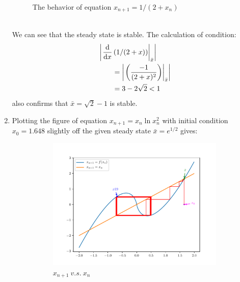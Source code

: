 \begin{homeworkProblem}[2]
\begin{enumerate}
\begin{figure}[h]
    \centering
    \caption{The behavior of equation $x_{n+1} = 1/(2+x_n)$}
\end{figure}
\\
We can see that the steady state is stable. The calculation of condition:
\[
    \begin{aligned}
        &\left|\left.\frac{\mathrm{d}}{\mathrm{d}x} \left(1/(2+x)\right)\right|_{\bar x}\right|\\
        &\qquad = \left| \left.\left(\frac{-1}{(2+x)^2}\right)\right|_{\bar x}
        \right|\\
        &\qquad = 3 - 2\sqrt{2} < 1
    \end{aligned}
\]
also confirms that $\bar x = \sqrt{2} - 1$ is stable.

\item Plotting the figure of equation $x_{n+1} = x_n \ln x_n^2$ with initial
condition $x_0 = 1.648$ slightly off the given steady state $\bar x = e^{1/2}$
gives:
\begin{figure}[h]
    \centering
    \begin{subfigure}[t]{0.4\linewidth}
        \centering
        \includegraphics[scale=0.5]{fig/fig2(d)_cob.pdf}
        \caption{$x_{n+1}\ v.s.\ x_n$}
    \end{subfigure}
    \hfill
    \begin{subfigure}[t]{0.4\linewidth}
        \centering

\end{subfigure}
\end{figure}
\end{enumerate}
\end{homeworkProblem}

